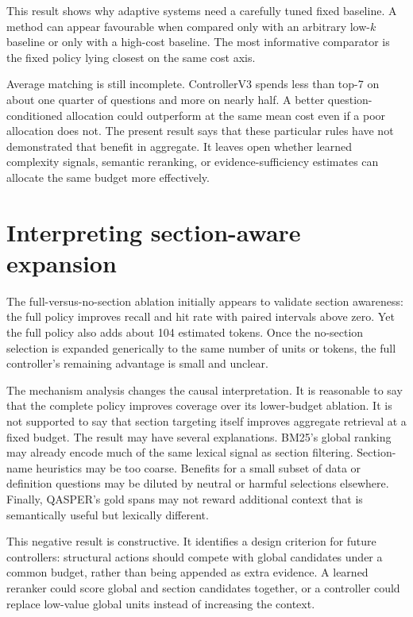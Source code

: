 This result shows why adaptive systems need a carefully tuned fixed baseline. A method can appear favourable when compared only with an arbitrary low-$k$ baseline or only with a high-cost baseline. The most informative comparator is the fixed policy lying closest on the same cost axis.

Average matching is still incomplete. ControllerV3 spends less than top-7 on about one quarter of questions and more on nearly half. A better question-conditioned allocation could outperform at the same mean cost even if a poor allocation does not. The present result says that these particular rules have not demonstrated that benefit in aggregate. It leaves open whether learned complexity signals, semantic reranking, or evidence-sufficiency estimates can allocate the same budget more effectively.

\section{Interpreting section-aware expansion}

The full-versus-no-section ablation initially appears to validate section awareness: the full policy improves recall and hit rate with paired intervals above zero. Yet the full policy also adds about 104 estimated tokens. Once the no-section selection is expanded generically to the same number of units or tokens, the full controller's remaining advantage is small and unclear.

The mechanism analysis changes the causal interpretation. It is reasonable to say that the complete policy improves coverage over its lower-budget ablation. It is not supported to say that section targeting itself improves aggregate retrieval at a fixed budget. The result may have several explanations. BM25's global ranking may already encode much of the same lexical signal as section filtering. Section-name heuristics may be too coarse. Benefits for a small subset of data or definition questions may be diluted by neutral or harmful selections elsewhere. Finally, QASPER's gold spans may not reward additional context that is semantically useful but lexically different.

This negative result is constructive. It identifies a design criterion for future controllers: structural actions should compete with global candidates under a common budget, rather than being appended as extra evidence. A learned reranker could score global and section candidates together, or a controller could replace low-value global units instead of increasing the context.

